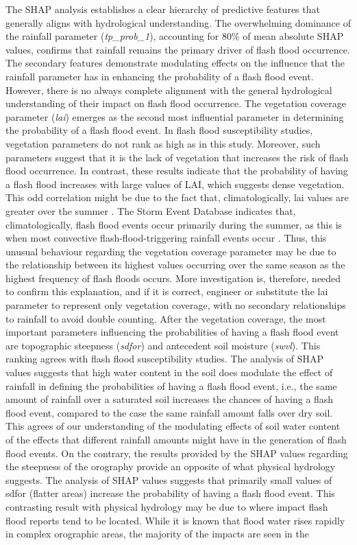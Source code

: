 The  SHAP analysis establishes a clear hierarchy of predictive features that generally aligns with hydrological understanding. The overwhelming dominance of the rainfall parameter (\textit{tp\_prob\_1}), accounting for 80\% of mean absolute SHAP values, confirms that rainfall remains the primary driver of flash flood occurrence. The secondary features demonstrate modulating effects on the influence that the rainfall parameter has in enhancing the probability of a flash flood event. However, there is no always complete alignment with the general hydrological understanding of their impact on flash flood occurrence. The vegetation coverage parameter (\textit{lai}) emerges as the second most influential parameter in determining the probability of a flash flood event. In flash flood susceptibility studies, vegetation parameters do not rank as high as in this study. Moreover, such parameters suggest that it is the lack of vegetation that increases the risk of flash flood occurrence. In contrast, these results indicate that the probability of having a flash flood increases with large values of LAI, which suggests dense vegetation. This odd correlation might be due to the fact that, climatologically, lai values are greater over the summer \citep{Owens_2018}. The Storm Event Database indicates that, climatologically, flash flood events occur primarily during the summer, as this is when most convective flash-flood-triggering rainfall events occur \citep{Davis_2001}. Thus, this unusual behaviour regarding the vegetation coverage parameter may be due to the relationship between its highest values occurring over the same season as the highest frequency of flash floods occurs. More investigation is, therefore, needed to confirm this explanation, and if it is correct, engineer or substitute the lai parameter to represent only vegetation coverage, with no secondary relationships to rainfall to avoid double counting. After the vegetation coverage, the most important parameters influencing the probabilities of having a flash flood event are topographic steepness (\textit{sdfor}) and antecedent soil moisture (\textit{swvl}). This ranking agrees with flash flood susceptibility studies. The analysis of SHAP values suggests that high water content in the soil does modulate the effect of rainfall in defining the probabilities of having a flash flood event, i.e., the same amount of rainfall over a saturated soil increases the chances of having a flash flood event, compared to the case the same rainfall amount falls over dry soil. This agrees of our understanding of the modulating effects of soil water content of the effects that different rainfall amounts might have in the generation of flash flood events. On the contrary, the results provided by the SHAP values regarding the steepness of the orography provide an opposite of what physical hydrology suggests. The analysis of SHAP values suggests that primarily small values of sdfor (flatter areas) increase the probability of having a flash flood event. This contrasting result with physical hydrology may be due to where impact flash flood reports tend to be located. While it is known that flood water rises rapidly in complex orographic areas, the majority of the impacts are seen in the 